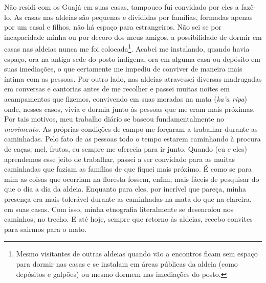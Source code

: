 Não residi com os Guajá em suas casas, tampouco fui convidado por eles a
fazê-lo. As casas nas aldeias são pequenas e divididas por famílias,
formadas apenas por um casal e filhos, não há espaço para estrangeiros.
Não sei se por incapacidade minha ou por decoro dos meus amigos, a
possibilidade de dormir em casas nas aldeias nunca me foi
colocada\footnote{Mesmo visitantes de outras aldeias quando vão a
  encontros ficam sem espaço para dormir nas casas e se instalam em
  áreas públicas da aldeia (como depósitos e galpões) ou mesmo dormem
  nas imediações do posto.}. Acabei me instalando, quando havia espaço,
ora na antiga sede do posto indígena, ora em alguma casa ou depósito em
suas imediações, o que certamente me impediu de conviver de maneira mais
íntima com as pessoas. Por outro lado, nas aldeias atravessei diversas
madrugadas em conversas e cantorias antes de me recolher e passei muitas
noites em acampamentos que fizemos, convivendo em suas moradas na mata
(\emph{ka'a ripa}) onde, nesses casos, vivia e dormia junto às pessoas
que me eram mais próximas. Por tais motivos, meu trabalho diário se
baseou fundamentalmente no \emph{movimento}. As próprias condições de
campo me forçaram a trabalhar durante as caminhadas. Pelo fato de as
pessoas todo o tempo estarem caminhando à procura de caças, mel, frutos,
eu sempre me oferecia para ir junto. Quando (eu e eles) aprendemos esse
jeito de trabalhar, passei a ser convidado para as muitas caminhadas que
faziam as famílias de que fiquei mais próximo. É como se para mim as
coisas que ocorriam na floresta fossem, enfim, mais fáceis de pesquisar
do que o dia a dia da aldeia. Enquanto para eles, por incrível que
pareça, minha presença era mais tolerável durante as caminhadas na mata
do que na clareira, em suas casas. Com isso, minha etnografia
literalmente se desenrolou nos caminhos, no trecho. E até hoje, sempre
que retorno às aldeias, recebo convites para sairmos para o mato.

